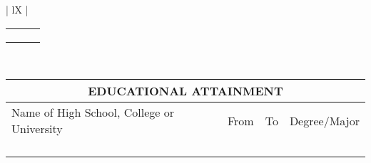 \documentclass{article}
\begin{document}
\begin{Form}
\begin{center}
\begin{tabularx}{\textwidth}{ | lX | }
{\begin{tabularx}{\textwidth}{ | X | X | X | }
						\TextField[name=Empl2,width=\linewidth]{} & \TextField[name=Pos2,width=\linewidth]{} & \TextField[name=EmplDate2,width=\linewidth]{}\\
						\TextField[name=Empl3,width=\linewidth]{} & \TextField[name=Pos3,width=\linewidth]{} & \TextField[name=EmplDate3,width=\linewidth]{}\\
						\TextField[name=Empl4,width=\linewidth]{} & \TextField[name=Pos4,width=\linewidth]{} & \TextField[name=EmplDate4,width=\linewidth]{}\\
						\hline
					\end{tabularx}
				}\\
				\hline
			\end{tabularx}
		\end{center}

		\begin{center}
			\begin{tabularx}{\textwidth}{ | X  X  X  X | }
				\hline
				\multicolumn{4}{|c|}{EDUCATIONAL ATTAINMENT}\\
				\hline
				\multicolumn{1}{|X}{Name of High School, College or University} & \multicolumn{1}{c}{From} & \multicolumn{1}{c}{To} & \multicolumn{1}{c|}{Degree/Major}\\
				\TextField[name=SchoolName1,width=\linewidth]{} & \TextField[name=StartDate1,width=\linewidth]{} & \TextField[name=EndDate1,width=\linewidth]{} & \TextField[name=Degree1,width=\linewidth]{}\\
				\TextField[name=SchoolName2,width=\linewidth]{} & \TextField[name=StartDate2,width=\linewidth]{} & \TextField[name=EndDate2,width=\linewidth]{} & \TextField[name=Degree2,width=\linewidth]{}\\
				\TextField[name=SchoolName3,width=\linewidth]{} & \TextField[name=StartDate3,width=\linewidth]{} & \TextField[name=EndDate3,width=\linewidth]{} & \TextField[name=Degree3,width=\linewidth]{}\\
				\TextField[name=SchoolName4,width=\linewidth]{} & \TextField[name=StartDate4,width=\linewidth]{} & \TextField[name=EndDate4,width=\linewidth]{} & \TextField[name=Degree4,width=\linewidth]{}\\
				\hline
			\end{tabularx}
		\end{center}


\end{Form}
\end{document}
